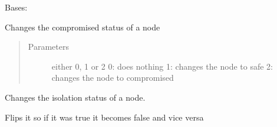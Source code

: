\documentclass[letterpaper,10pt,english]{sphinxmanual}
\begin{document}
\begin{fulllineitems}
\label{\detokenize{source/yawning_titan.envs.specific.core:yawning_titan.envs.specific.core.nsa_node.Node}}
\sphinxAtStartPar
Bases: 

\begin{fulllineitems}
\label{\detokenize{source/yawning_titan.envs.specific.core:yawning_titan.envs.specific.core.nsa_node.Node.change_compromised}}
\sphinxAtStartPar
Changes the compromised status of a node
\begin{quote}\begin{description}
\item[{Parameters}] \leavevmode
\sphinxAtStartPar
{} \textendash{} either 0, 1 or 2
0: does nothing
1: changes the node to safe
2: changes the node to compromised

\end{description}\end{quote}

\end{fulllineitems}


\begin{fulllineitems}
\label{\detokenize{source/yawning_titan.envs.specific.core:yawning_titan.envs.specific.core.nsa_node.Node.change_isolated}}
\sphinxAtStartPar
Changes the isolation status of a node.

\sphinxAtStartPar
Flips it so if it was true it becomes false and vice versa

\end{fulllineitems}



\end{fulllineitems}
\end{document}
